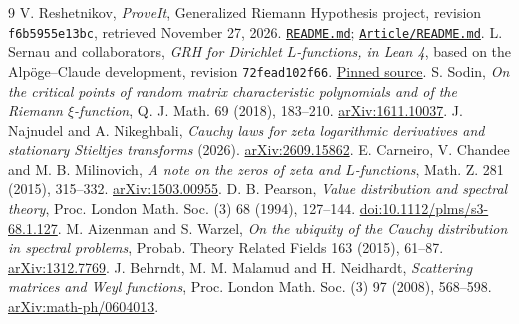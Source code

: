 \documentclass[11pt]{article}
\newcommand{\repo}[1]{\href{https://github.com/VladimirReshetnikov/ProveIt/blob/f6b5955e13bcefb2760480e7b823eba55ed2383e/Analysis/GeneralizedRiemannHypothesis/#1}{\nolinkurl{#1}}}
\begin{document}
\begin{thebibliography}{9}\small
{} V. Reshetnikov, \emph{ProveIt}, Generalized Riemann Hypothesis project, revision \texttt{f6b5955e13bc}, retrieved November 27, 2026. \repo{README.md}; \repo{Article/README.md}.
 L. Sernau and collaborators, \emph{GRH for Dirichlet $L$-functions, in Lean 4}, based on the Alp\"oge--Claude development, revision \texttt{72fead102f66}. \href{https://github.com/lsernau/grh-lean/tree/72fead102f663d5c7a407964a13dc0cf9d977207}{Pinned source}.
 S. Sodin, \emph{On the critical points of random matrix characteristic polynomials and of the Riemann $\xi$-function}, Q. J. Math. 69 (2018), 183--210. \href{https://arxiv.org/abs/1611.10037}{arXiv:1611.10037}.
 J. Najnudel and A. Nikeghbali, \emph{Cauchy laws for zeta logarithmic derivatives and stationary Stieltjes transforms} (2026). \href{https://arxiv.org/abs/2609.15862}{arXiv:2609.15862}.
 E. Carneiro, V. Chandee and M. B. Milinovich, \emph{A note on the zeros of zeta and $L$-functions}, Math. Z. 281 (2015), 315--332. \href{https://arxiv.org/abs/1503.00955}{arXiv:1503.00955}.
 D. B. Pearson, \emph{Value distribution and spectral theory}, Proc. London Math. Soc. (3) 68 (1994), 127--144. \href{https://doi.org/10.1112/plms/s3-68.1.127}{doi:10.1112/plms/s3-68.1.127}.
 M. Aizenman and S. Warzel, \emph{On the ubiquity of the Cauchy distribution in spectral problems}, Probab. Theory Related Fields 163 (2015), 61--87. \href{https://arxiv.org/abs/1312.7769}{arXiv:1312.7769}.
 J. Behrndt, M. M. Malamud and H. Neidhardt, \emph{Scattering matrices and Weyl functions}, Proc. London Math. Soc. (3) 97 (2008), 568--598. \href{https://arxiv.org/abs/math-ph/0604013}{arXiv:math-ph/0604013}.
\end{thebibliography}
\end{document}
